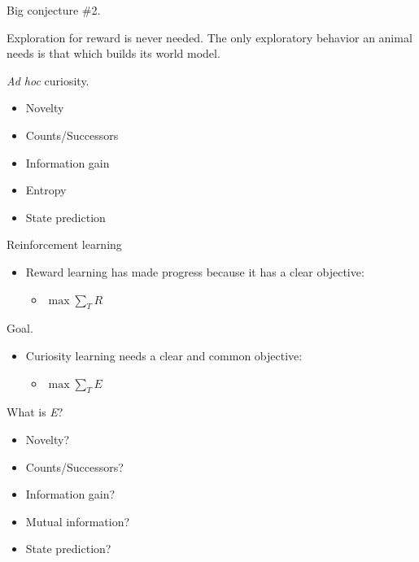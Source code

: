 \documentclass[10pt]{beamer}
\begin{document}
\begin{frame}[fragile]{Big conjecture \#2.}
\begin{center}
    Exploration for reward is never needed. The only exploratory behavior an animal needs is that which builds its world model.
\end{center}
\end{frame}

\begin{frame}[fragile]{\textit{Ad hoc} curiosity.}
\begin{itemize}
    \item Novelty
    \item Counts/Successors
    \item Information gain
    \item Entropy
    \item State prediction
\end{itemize}
\end{frame}

\begin{frame}[fragile]{Reinforcement learning}
\begin{itemize}
    \item Reward learning has made progress because it has a clear objective:
    \begin{itemize}
        \item $ \max \sum_T R$
    \end{itemize}
\end{itemize}
\end{frame}

\begin{frame}[fragile]{Goal.}
\begin{itemize}
    \item Curiosity learning needs a clear and common objective:
    \begin{itemize}
        \item $ \max \sum_T E$
    \end{itemize}
\end{itemize}
\end{frame}

\begin{frame}[fragile]{What is \textit{E}?}
\begin{itemize}
    \item Novelty?
    \item Counts/Successors?
    \item Information gain?
    \item Mutual information? 
    \item State prediction?
\end{itemize}
\end{frame}
\end{document}

